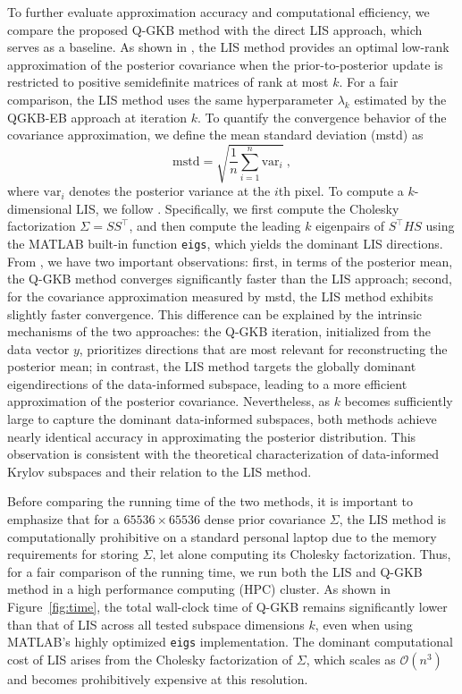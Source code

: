 \documentclass[]{myarticle}
\begin{document}
To further evaluate approximation accuracy and computational efficiency, we compare the proposed Q-GKB method with the direct LIS approach, which serves as a baseline. As shown in \cite{spantini2015optimal,spantini2017goal}, the LIS method provides an optimal low-rank approximation of the posterior covariance when the prior-to-posterior update is restricted to positive semidefinite matrices of rank at most $k$. For a fair comparison, the LIS method uses the same hyperparameter $\lambda_k$ estimated by the QGKB-EB approach at iteration $k$. To quantify the convergence behavior of the covariance approximation, we define the mean standard deviation (mstd) as
\begin{equation}\label{mstd}
  \mathrm{mstd} = \sqrt{\frac{1}{n}\sum_{i=1}^{n}\mathrm{var}_i} \ ,
\end{equation}
where $\mathrm{var}_i$ denotes the posterior variance at the $i$th pixel. To compute a $k$-dimensional LIS, we follow \cite{spantini2015optimal}. Specifically, we first compute the Cholesky factorization $\Sigma = SS^\top$, and then compute the leading $k$ eigenpairs of $S^\top H S$ using the MATLAB built-in function \texttt{eigs}, which yields the dominant LIS directions. From , we have two important observations: first, in terms of the posterior mean, the Q-GKB method converges significantly faster than the LIS approach; second, for the covariance approximation measured by mstd, the LIS method exhibits slightly faster convergence. This difference can be explained by the intrinsic mechanisms of the two approaches: the Q-GKB iteration, initialized from the data vector $y$, prioritizes directions that are most relevant for reconstructing the posterior mean; in contrast, the LIS method targets the globally dominant eigendirections of the data-informed subspace, leading to a more efficient approximation of the posterior covariance. Nevertheless, as $k$ becomes sufficiently large to capture the dominant data-informed subspaces, both methods achieve nearly identical accuracy in approximating the posterior distribution. This observation is consistent with the theoretical characterization of data-informed Krylov subspaces and their relation to the LIS method.

Before comparing the running time of the two methods, it is important to emphasize that for a $65536 \times 65536$ dense prior covariance $\Sigma$, the LIS method is computationally prohibitive on a standard personal laptop due to the memory requirements for storing $\Sigma$, let alone computing its Cholesky factorization. Thus, for a fair comparison of the running time, we run both the LIS and Q-GKB method in a high performance computing (HPC) cluster. As shown in Figure~\ref{fig:time}, the total wall-clock time of Q-GKB remains significantly lower than that of LIS across all tested subspace dimensions $k$, even when using MATLAB's highly optimized \texttt{eigs} implementation. The dominant computational cost of LIS arises from the Cholesky factorization of $\Sigma$, which scales as $\mathcal{O}(n^3)$ and becomes prohibitively expensive at this resolution.
\end{document}
